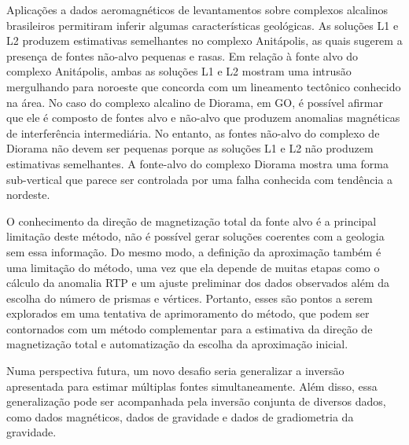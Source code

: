Aplicações a dados aeromagnéticos de levantamentos sobre complexos alcalinos brasileiros permitiram inferir algumas características geológicas.
As soluções L1 e L2 produzem estimativas semelhantes no complexo Anitápolis, as quais sugerem a presença de fontes não-alvo pequenas e rasas.
Em relação à fonte alvo do complexo Anitápolis, ambas as soluções L1 e L2 mostram uma intrusão mergulhando para noroeste que concorda com um lineamento tectônico conhecido na área.
No caso do complexo alcalino de Diorama, em GO, é possível afirmar que ele é composto de fontes alvo e não-alvo que produzem anomalias magnéticas de interferência intermediária.
No entanto, as fontes não-alvo do complexo de Diorama não devem ser pequenas porque as soluções L1 e L2 não produzem estimativas semelhantes.
A fonte-alvo do complexo Diorama mostra uma forma sub-vertical que parece ser controlada por uma falha conhecida com tendência a nordeste.

O conhecimento da direção de magnetização total da fonte alvo é a principal limitação deste método, não é possível gerar soluções coerentes com a geologia sem essa informação.
Do mesmo modo, a definição da aproximação também é uma limitação do método, uma vez que ela depende de muitas etapas como o cálculo da anomalia RTP e um ajuste preliminar dos dados observados além da escolha do número de prismas e vértices.
Portanto, esses são pontos a serem explorados em uma tentativa de aprimoramento do método, que podem ser contornados com um método complementar para a estimativa da direção de magnetização total e automatização da escolha da aproximação inicial.

Numa perspectiva futura, um novo desafio seria generalizar a inversão apresentada para estimar múltiplas fontes simultaneamente.
Além disso, essa generalização pode ser acompanhada pela inversão conjunta de diversos dados, como dados magnéticos, dados de gravidade e dados de gradiometria da gravidade.